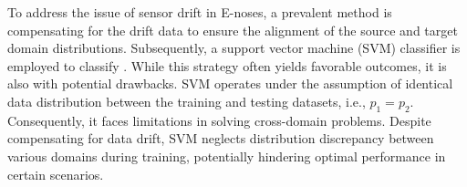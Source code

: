 \documentclass[a4paper]{cas-sc}
\begin{document}
To address the issue of sensor drift in E-noses, a prevalent method is compensating for the drift data to ensure the alignment of the source and target domain distributions. Subsequently, a support vector machine (SVM) classifier is employed to classify \citep{YAN2022107664, ZHANG2017407, GUO2022118237}.
While this strategy often yields favorable outcomes, it is also with potential drawbacks. SVM operates under the assumption of identical data distribution between the training and testing datasets, i.e., ${{p}_{1}} = {{p}_{2}}$. Consequently, it faces limitations in solving cross-domain problems. Despite compensating for data drift, SVM neglects distribution discrepancy between various domains during training, potentially hindering optimal performance in certain scenarios. 
\end{document}
